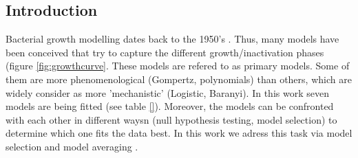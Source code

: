 \documentclass[titlepage,11pt]{article}
\begin{document}
	\begin{linenumbers}
		\section{Introduction}\label{sec:introduction}
		Bacterial growth modelling dates back to the 1950's \cite{Schaechter2015}. Thus, many models have been conceived that try to capture the different growth/inactivation phases (figure \ref{fig:growthcurve}. These models are refered to as primary models. Some of them are more phenomenological (Gompertz, polynomials) than others, which are widely consider as more 'mechanistic' (Logistic, Baranyi). In this work seven models are being fitted (see table \ref{}). Moreover, the models can be confronted with each other in different waysn (null hypothesis testing, model selection) to determine which one fits the data best. In this work we adress this task via model selection and model averaging \cite{Anderson2002, Johnson2004}. \\
		

\end{linenumbers}
\end{document}
